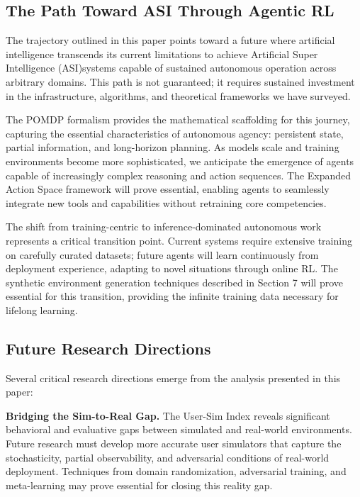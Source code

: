 \subsection{The Path Toward ASI Through Agentic RL}

The trajectory outlined in this paper points toward a future where artificial intelligence transcends its current limitations to achieve Artificial Super Intelligence (ASI)systems capable of sustained autonomous operation across arbitrary domains. This path is not guaranteed; it requires sustained investment in the infrastructure, algorithms, and theoretical frameworks we have surveyed.

The POMDP formalism provides the mathematical scaffolding for this journey, capturing the essential characteristics of autonomous agency: persistent state, partial information, and long-horizon planning. As models scale and training environments become more sophisticated, we anticipate the emergence of agents capable of increasingly complex reasoning and action sequences. The Expanded Action Space framework will prove essential, enabling agents to seamlessly integrate new tools and capabilities without retraining core competencies.

The shift from training-centric to inference-dominated autonomous work represents a critical transition point. Current systems require extensive training on carefully curated datasets; future agents will learn continuously from deployment experience, adapting to novel situations through online RL. The synthetic environment generation techniques described in Section 7 will prove essential for this transition, providing the infinite training data necessary for lifelong learning.

\subsection{Future Research Directions}

Several critical research directions emerge from the analysis presented in this paper:

\textbf{Bridging the Sim-to-Real Gap.} The User-Sim Index reveals significant behavioral and evaluative gaps between simulated and real-world environments. Future research must develop more accurate user simulators that capture the stochasticity, partial observability, and adversarial conditions of real-world deployment. Techniques from domain randomization, adversarial training, and meta-learning may prove essential for closing this reality gap.

